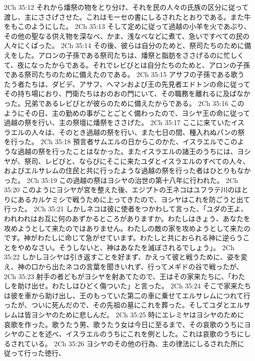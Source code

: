 2Ch 35:12  それから燔祭の物をとり分け、それを民の人々の氏族の区分に従って渡し、主にささげさせた。これはモーセの書にしるされたとおりである。また牛をもこのようにした。
2Ch 35:13  そして定めに従って過越の小羊を火であぶり、その他の聖なる供え物を深なべ、かま、浅なべなどに煮て、急いですべての民の人々にくばった。
2Ch 35:14  その後、彼らは自分のためと、祭司たちのために備えをした。アロンの子孫である祭司たちは、燔祭と脂肪をささげるのに忙しくて、夜になったからである。それでレビびとは自分たちのためと、アロンの子孫である祭司たちのために備えたのである。
2Ch 35:15  アサフの子孫である歌うたう者たちは、ダビデ、アサフ、ヘマンおよび王の先見者エドトンの命に従ってその持ち場におり、門衛たちはおのおの門にいて、その職務を離れるに及ばなかった。兄弟であるレビびとが彼らのために備えたからである。
2Ch 35:16  このようにその日、主の勤めの事がことごとく備わったので、ヨシヤ王の命に従って過越の祭を行い、主の祭壇に燔祭をささげた。
2Ch 35:17  ここに来ていたイスラエルの人々は、そのとき過越の祭を行い、また七日の間、種入れぬパンの祭を行った。
2Ch 35:18  預言者サムエルの日からこのかた、イスラエルでこのような過越の祭を行ったことはなかった。またイスラエルの諸王のうちには、ヨシヤが、祭司、レビびと、ならびにそこに来たユダとイスラエルのすべての人々、およびエルサレムの住民と共に行ったような過越の祭を行った者はひとりもなかった。
2Ch 35:19  この過越の祭はヨシヤの治世の第十八年に行われた。
2Ch 35:20  このようにヨシヤが宮を整えた後、エジプトの王ネコはユフラテ川のほとりにあるカルケミシで戦うために上ってきたので、ヨシヤはこれを防ごうと出て行った。
2Ch 35:21  しかしネコは彼に使者をつかわして言った、「ユダの王よ、われわれはお互に何のあずかるところがありますか。わたしはきょう、あなたを攻めようとして来たのではありません。わたしの敵の家を攻めようとして来たのです。神がわたしに命じて急がせています。わたしと共におられる神に逆らうことをやめなさい。そうしないと、神はあなたを滅ぼされるでしょう」。
2Ch 35:22  しかしヨシヤは引き返すことを好まず、かえって彼と戦うために、姿を変え、神の口から出たネコの言葉を聞きいれず、行ってメギドの谷で戦ったが、
2Ch 35:23  射手の者どもがヨシヤを射あてたので、王はその家来たちに、「わたしを助け出せ。わたしはひどく傷ついた」と言った。
2Ch 35:24  そこで家来たちは彼を車から助け出し、王のもっていた第二の車に乗せてエルサレムにつれて行ったが、ついに死んだので、その先祖の墓にこれを葬った。そしてユダとエルサレムは皆ヨシヤのために悲しんだ。
2Ch 35:25  時にエレミヤはヨシヤのために哀歌を作った。歌うたう男、歌うたう女は今日に至るまで、その哀歌のうちにヨシヤのことを述べ、イスラエルのうちにこれを例とした。これは哀歌のうちにしるされている。
2Ch 35:26  ヨシヤのその他の行為、主の律法にしるされた所に従って行った徳行、
